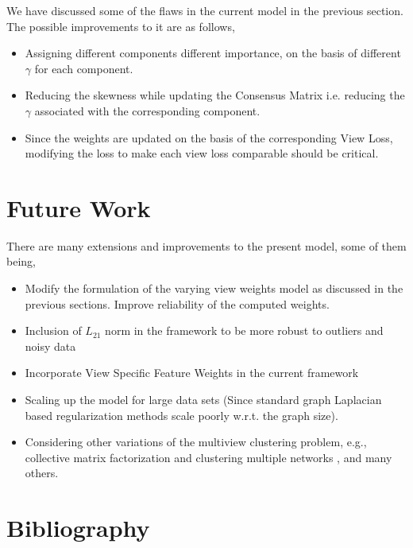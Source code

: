 \documentclass[a4paper]{article}
\begin{document}
	We have discussed some of the flaws in the current model in the previous section. The possible improvements to it are as follows,
	\begin{itemize}
	\item Assigning different components different importance, on the basis of different $\gamma$ for each component.
	\item Reducing the skewness while updating the Consensus Matrix i.e. reducing the $\gamma$ associated with the corresponding component.
	\item Since the weights are updated on the basis of the corresponding View Loss, modifying the loss to make each view loss comparable should be critical.
	\end{itemize}
	
	\section{Future Work}	
	
	There are many extensions and improvements to the present model, some of them being,
	\begin{itemize}
		\item Modify the formulation of the varying view weights model as discussed in the previous sections. Improve reliability of the computed weights.
		\item Inclusion of $L_{21}$ norm in the framework to be more robust to outliers and noisy data \cite{huang2014robust}
		\item Incorporate View Specific Feature Weights in the current framework \cite{wang2013multi}
		\item Scaling up the model for large data sets (Since standard graph Laplacian based regularization methods scale poorly w.r.t. the graph size).
		\item Considering other variations of the multiview clustering problem, e.g., collective matrix factorization \cite{bouchard2013convex} and clustering multiple networks \cite{ni2015flexible}, and many others.	
	\end{itemize}		
	
	\pagebreak	
	
	\section{Bibliography}	
	
	

		
	
\end{document}
